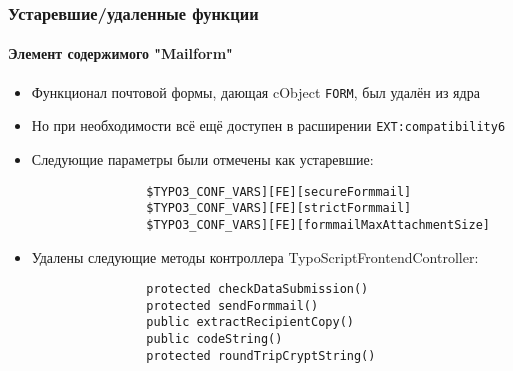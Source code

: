 
\begin{frame}[fragile]
	\frametitle{Устаревшие/удаленные функции}
	\framesubtitle{Элемент содержимого "Mailform"}

	\begin{itemize}

		\item Функционал почтовой формы, дающая cObject \texttt{FORM}, был
			удалён из ядра
		
		\item Но при необходимости всё ещё доступен в расширении \texttt{EXT:compatibility6}

		\item Следующие параметры были отмечены как устаревшие:

			\begin{lstlisting}
				$TYPO3_CONF_VARS][FE][secureFormmail]
				$TYPO3_CONF_VARS][FE][strictFormmail]
				$TYPO3_CONF_VARS][FE][formmailMaxAttachmentSize]
			\end{lstlisting}

		\item Удалены следующие методы контроллера TypoScriptFrontendController:

			\begin{lstlisting}
				protected checkDataSubmission()
				protected sendFormmail()
				public extractRecipientCopy()
				public codeString()
				protected roundTripCryptString()
			\end{lstlisting}

	\end{itemize}

\end{frame}


